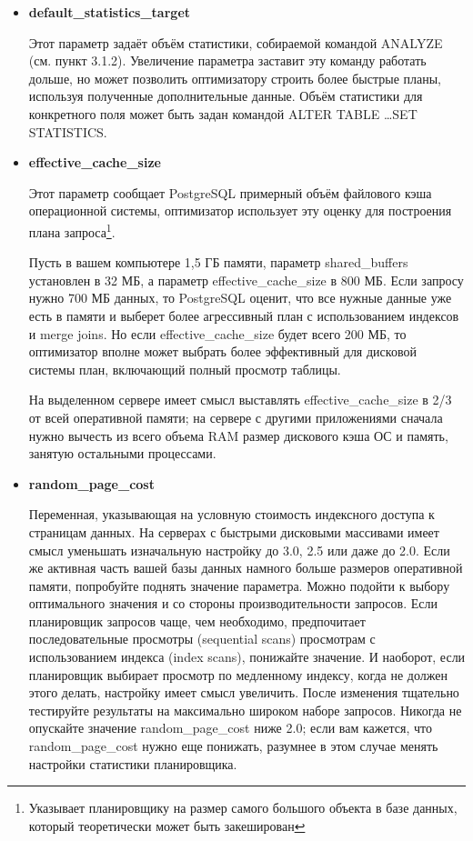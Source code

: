 \begin{itemize}
\item \textbf{default\_statistics\_target}

Этот параметр задаёт объём статистики, собираемой командой ANALYZE (см. пункт 3.1.2).
Увеличение параметра заставит эту команду работать дольше, но может позволить оптимизатору строить более быстрые планы,
используя полученные дополнительные данные. Объём статистики для конкретного поля может быть задан командой
ALTER TABLE \dots SET STATISTICS.

\item \textbf{effective\_cache\_size}

Этот параметр сообщает PostgreSQL примерный объём файлового кэша операционной системы, оптимизатор использует эту оценку для
построения плана запроса\footnote{Указывает планировщику на размер самого большого объекта в базе данных, который
теоретически может быть закеширован}.

Пусть в вашем компьютере 1,5 ГБ памяти, параметр shared\_buffers установлен в 32 МБ, а параметр effective\_cache\_size в 800 МБ.
Если запросу нужно 700 МБ данных, то PostgreSQL оценит, что все нужные данные уже есть в памяти и выберет более агрессивный план с
использованием индексов и merge joins. Но если effective\_cache\_size будет всего 200 МБ, то оптимизатор вполне может выбрать более
эффективный для дисковой системы план, включающий полный просмотр таблицы.

На выделенном сервере имеет смысл выставлять effective\_cache\_size в 2/3 от всей оперативной памяти; на сервере с
другими приложениями сначала нужно вычесть из всего объема RAM размер дискового кэша ОС и память,
занятую остальными процессами.

\item \textbf{random\_page\_cost}

Переменная, указывающая на условную стоимость индексного доступа к страницам данных. На серверах с быстрыми дисковыми
массивами имеет смысл уменьшать изначальную настройку до 3.0, 2.5 или даже до 2.0. Если же активная часть вашей базы данных
намного больше размеров оперативной памяти, попробуйте поднять значение параметра. Можно подойти к выбору оптимального значения
и со стороны производительности запросов. Если планировщик запросов чаще, чем необходимо, предпочитает последовательные просмотры
(sequential scans) просмотрам с использованием индекса (index scans), понижайте значение. И наоборот, если планировщик выбирает
просмотр по медленному индексу, когда не должен этого делать, настройку имеет смысл увеличить. После изменения тщательно тестируйте
результаты на максимально широком наборе запросов. Никогда не опускайте значение random\_page\_cost ниже 2.0; если вам кажется,
что random\_page\_cost нужно еще понижать, разумнее в этом случае менять настройки статистики планировщика.
\end{itemize}

